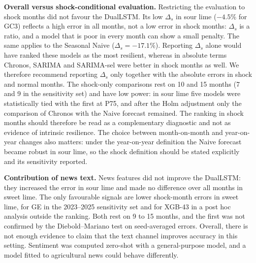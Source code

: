 \documentclass[forecasting,article,submit,moreauthors]{Definitions/mdpi}
\begin{document}
\textbf{Overall versus shock-conditional evaluation.} Restricting the evaluation to shock months did not favour the DualLSTM. Its low $\Delta_s$ in sour lime ($-4.5$\% for GC3) reflects a high error in all months, not a low error in shock months: $\Delta_s$ is a ratio, and a model that is poor in every month can show a small penalty. The same applies to the Seasonal Naive ($\Delta_s=-17.1$\%). Reporting $\Delta_s$ alone would have ranked these models as the most resilient, whereas in absolute terms Chronos, SARIMA and SARIMA-sel were better in shock months as well. We therefore recommend reporting $\Delta_s$ only together with the absolute errors in shock and normal months. The shock-only comparisons rest on 10 and 15 months (7 and 9 in the sensitivity set) and have low power: in sour lime five models were statistically tied with the first at P75, and after the Holm adjustment only the comparison of Chronos with the Naive forecast remained. The ranking in shock months should therefore be read as a complementary diagnostic and not as evidence of intrinsic resilience. The choice between month-on-month and year-on-year changes also matters: under the year-on-year definition the Naive forecast became robust in sour lime, so the shock definition should be stated explicitly and its sensitivity reported.

\textbf{Contribution of news text.} News features did not improve the DualLSTM: they increased the error in sour lime and made no difference over all months in sweet lime. The only favourable signals are lower shock-month errors in sweet lime, for GE in the 2023--2025 sensitivity set and for XGB-43 in a post hoc analysis outside the ranking. Both rest on 9 to 15 months, and the first was not confirmed by the Diebold--Mariano test on seed-averaged errors. Overall, there is not enough evidence to claim that the text channel improves accuracy in this setting. Sentiment was computed zero-shot with a general-purpose model, and a model fitted to agricultural news could behave differently.
\end{document}
